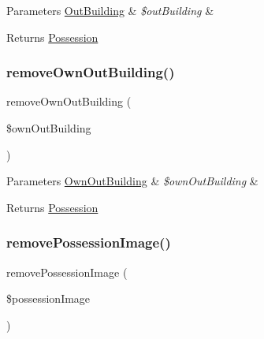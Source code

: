 \begin{DoxyParams}[1]{Parameters}
\mbox{\hyperlink{class_app_1_1_entity_1_1_out_building}{Out\+Building}} & {\em \$out\+Building} & \\
\hline
\end{DoxyParams}
\begin{DoxyReturn}{Returns}
\mbox{\hyperlink{class_app_1_1_entity_1_1_possession}{Possession}} 
\end{DoxyReturn}
\mbox{\label{class_app_1_1_entity_1_1_possession_a86b76f753808f1339ddca94a754da3d2}} 
\subsubsection{\texorpdfstring{removeOwnOutBuilding()}{removeOwnOutBuilding()}}
{\footnotesize\ttfamily remove\+Own\+Out\+Building (\begin{DoxyParamCaption}\item[{\mbox{\hyperlink{class_app_1_1_entity_1_1_own_out_building}{Own\+Out\+Building}}}]{\$own\+Out\+Building }\end{DoxyParamCaption})}


\begin{DoxyParams}[1]{Parameters}
\mbox{\hyperlink{class_app_1_1_entity_1_1_own_out_building}{Own\+Out\+Building}} & {\em \$own\+Out\+Building} & \\
\hline
\end{DoxyParams}
\begin{DoxyReturn}{Returns}
\mbox{\hyperlink{class_app_1_1_entity_1_1_possession}{Possession}} 
\end{DoxyReturn}
\mbox{\label{class_app_1_1_entity_1_1_possession_a61c52551493a4e8ae6bd5a11b44bdb65}} 
\subsubsection{\texorpdfstring{removePossessionImage()}{removePossessionImage()}}
{\footnotesize\ttfamily remove\+Possession\+Image (\begin{DoxyParamCaption}\item[{\mbox{\hyperlink{class_app_1_1_entity_1_1_possession_image}{Possession\+Image}}}]{\$possession\+Image }\end{DoxyParamCaption})}


